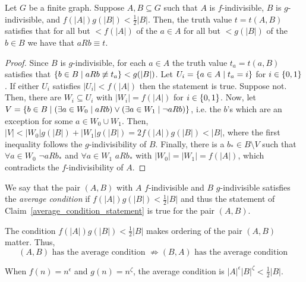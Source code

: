     \begin{lemma}[Claim 4.6)] \label{average_condition_statement}
        Let $G$ be a finite graph.
        Suppose $A, B \subseteq G$ such that $A$ is $f$-indivisible, $B$ is $g$-indivisible, and $f(|A|) g(|B|) < \frac{1}{2} |B|$.
        Then, the truth value $t = t(A,B)$ satisfies that for all but $< f(|A|)$ of the $a \in A$ for all but $< g(|B|)$ of
        the $b \in B$ we have that $a R b \equiv t$.
        \begin{proof}
            Since $B$ is $g$-indivisible, for each $a \in A$ the truth value $t_a = t(a,B)$ satisfies that
            $\left\{ b \in B \mid a R b \not\equiv t_a \right\} < g(|B|)$.
            Let $U_i = \left\{ a \in A \mid t_a = i \right\}$ for $i \in \left\{ 0,1 \right\}$.
            If either $U_i$ satisfies $|U_i| < f(|A|)$ then the statement is true.
            Suppose not.
            Then, there are $W_i \subseteq U_i$ with $|W_i| = f(|A|)$ for $i \in \left\{ 0,1 \right\}$.
            Now, let $V = \left\{ b \in B \mid (\exists a \in W_0 \mid a R b) \vee (\exists a \in W_1 \mid \lnot a R b) \right\}$,
            i.e. the $b$'s which are an exception for some $a \in W_0 \cup W_1$.
            Then, $|V| < |W_0| g(|B|) + |W_1| g(|B|) = 2 f(|A|) g(|B|) < |B|$, where the first inequality follows the
            $g$-indivisibility of $B$.
            Finally, there is a $b_* \in B \setminus V$ such that $\forall a \in W_0$ $\lnot a R b_*$ and
            $\forall a \in W_1$ $a R b_*$ with $|W_0| = |W_1| = f(|A|)$, which contradicts the $f$-indivisibility of $A$.
        \end{proof}
    \end{lemma}

    \begin{definition}
        We say that the pair $(A,B)$ with $A$ $f$-indivisible and $B$ $g$-indivisible satisfies the \emph{average condition} if
        $f(|A|) g(|B|) < \frac{1}{2} |B|$ and thus the statement of Claim~\ref{average_condition_statement} is true for
        the pair $(A,B)$.
    \end{definition}

    \begin{remark}
        The condition $f(|A|) g(|B|) < \frac{1}{2} |B|$ makes ordering of the pair $(A,B)$ matter.
        Thus,
        \[
            (A,B) \text{ has the average condition } \not\Rightarrow (B,A) \text{ has the average condition }
        \]
    \end{remark}

    \begin{remark}[Remark 4.7]
        When $f(n) = n^\epsilon$ and $g(n) = n^\zeta$, the average condition is $|A|^\epsilon |B|^\zeta < \frac{1}{2} |B|$.
    \end{remark}


